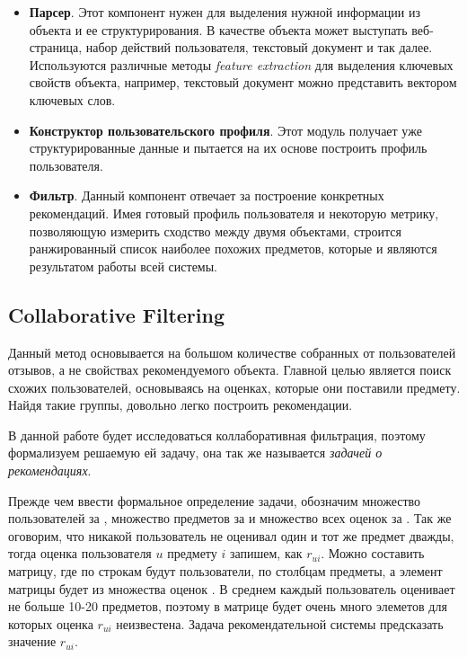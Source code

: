 \begin{itemize}
\item \textbf{Парсер}. Этот компонент нужен для выделения нужной информации из объекта и ее структурирования. В качестве объекта может выступать веб-страница, набор действий пользователя, текстовый документ и так далее. Используются различные методы \textit{feature extraction} для выделения ключевых свойств объекта, например, текстовый документ можно представить вектором ключевых слов.

\item \textbf{Конструктор пользовательского профиля}. Этот модуль получает уже структурированные данные и пытается на их основе построить профиль пользователя. 

\item \textbf{Фильтр}. Данный компонент отвечает за построение конкретных рекомендаций. Имея готовый профиль пользователя и некоторую метрику, позволяющую измерить сходство между двумя объектами, строится ранжированный список наиболее похожих предметов, которые и являются результатом работы всей системы.

\end{itemize}

\subsection{Collaborative Filtering}

Данный метод основывается на большом количестве собранных от пользователей отзывов, а не свойствах рекомендуемого объекта. Главной целью является поиск схожих пользователей, основываясь на оценках, которые они поставили предмету. Найдя такие группы, довольно легко построить рекомендации.

В данной работе будет исследоваться коллаборативная фильтрация, поэтому формализуем решаемую ей задачу, она так же называется \textit{задачей о рекомендациях}.

Прежде чем ввести формальное определение задачи, обозначим множество пользователей за , множество предметов за  и множество всех оценок за . Так же оговорим, что никакой пользователь не оценивал один и тот же предмет дважды, тогда оценка пользователя $u$ предмету $i$ запишем, как $r_{ui}$. Можно составить матрицу, где по строкам будут пользователи, по столбцам предметы, а элемент матрицы будет из множества оценок . В среднем каждый пользователь оценивает не больше 10-20 предметов, поэтому в матрице будет очень много элеметов для которых оценка $r_{ui}$ неизвестена. Задача рекомендательной системы предсказать значение $r_{ui}$.

